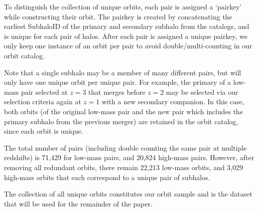 \documentclass[twocolumn,linenumbers]{aastex631}
\begin{document}
To distinguish the collection of unique orbits, each pair is assigned a `pairkey' while constructing their orbit. 
The pairkey is created by concatenating the earliest SubhaloID of the primary and secondary subhalo from the \sublink{} catalogs, and is unique for each pair of halos. 
After each pair is assigned a unique pairkey, we only keep one instance of an orbit per pair to avoid double/multi-counting in our orbit catalog.

Note that a single subhalo may be a member of many different pairs, but will only have one unique orbit per unique pair.
For example, the primary of a low-mass pair selected at $z=3$ that merges before $z=2$ may be selected via our selection criteria again at $z=1$ with a new secondary companion. 
In this case, both orbits (of the original low-mass pair and the new pair which includes the primary subhalo from the previous merger) are retained in the orbit catalog, since each orbit is unique.

The total number of pairs (including double counting the same pair at multiple redshifts) is 71,429 for low-mass pairs, and 20,824 high-mass pairs. 
However, after removing all redundant orbits, there remain 22,213 low-mass orbits, and 3,029 high-mass orbits that each correspond to a unique pair of subhalos.

The collection of all unique orbits constitutes our orbit sample and is the dataset that will be used for the remainder of the paper.
\end{document}
